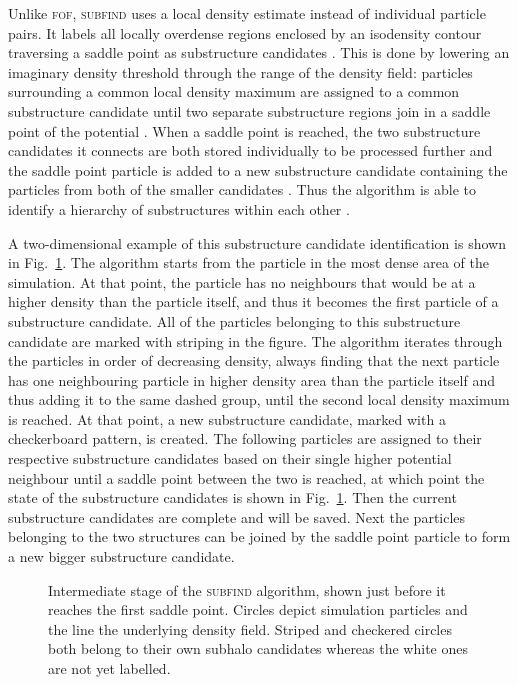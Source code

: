 \documentclass[english, twoside]{HYgradu}
\begin{document}
Unlike \textsc{fof}, \textsc{subfind} uses a local density estimate instead of individual particle pairs. It labels all locally overdense regions enclosed by an isodensity contour traversing a saddle point as substructure candidates \citep{springel2001populating}. This is done by lowering an imaginary density threshold through the range of the density field: particles surrounding a common local density maximum are assigned to a common substructure candidate until two separate substructure regions join in a saddle point of the potential \citep{springel2001populating}. When a saddle point is reached, the two substructure candidates it connects are both stored individually to be processed further and the saddle point particle is added to a new substructure candidate containing the particles from both of the smaller candidates \citep{springel2001populating}. Thus the algorithm is able to identify a hierarchy of substructures within each other \citep{springel2001populating}.

A two-dimensional example of this substructure candidate identification is shown in Fig.\ \ref{fig:subfind}. The algorithm starts from the particle in the most dense area of the simulation. At that point, the particle has no neighbours that would be at a higher density than the particle itself, and thus it becomes the first particle of a substructure candidate. All of the particles belonging to this substructure candidate are marked with striping in the figure. The algorithm iterates through the particles in order of decreasing density, always finding that the next particle has one neighbouring particle in higher density area than the particle itself and thus adding it to the same dashed group, until the second local density maximum is reached. At that point, a new substructure candidate, marked with a checkerboard pattern, is created. The following particles are assigned to their respective substructure candidates based on their single higher potential neighbour until a saddle point between the two is reached, at which point the state of the substructure candidates is shown in Fig.\ \ref{fig:subfind}. Then the current substructure candidates are complete and will be saved. Next the particles belonging to the two structures can be joined by the saddle point particle to form a new bigger substructure candidate.

\begin{figure}
    \centering
    
    \caption{Intermediate stage of the \textsc{subfind} algorithm, shown just before it reaches the first saddle point. Circles depict simulation particles and the line the underlying density field. Striped and checkered circles both belong to their own subhalo candidates whereas the white ones are not yet labelled.}\label{fig:subfind}
\end{figure}
\end{document}
